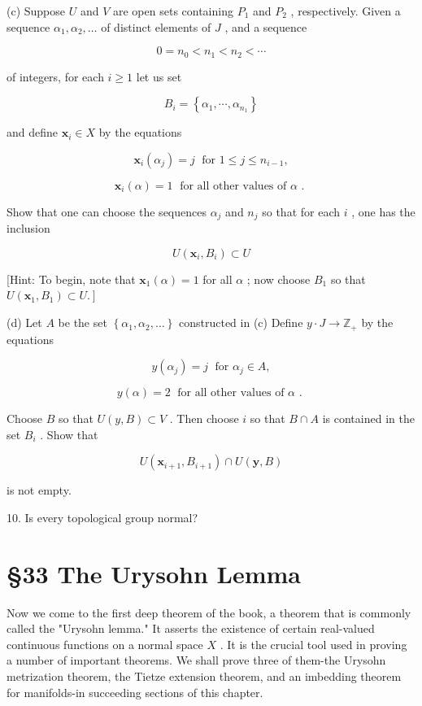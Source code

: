 (c) Suppose \(U\) and \(V\) are open sets containing \({P}_{1}\) and \({P}_{2}\) , respectively. Given a sequence \({\alpha }_{1},{\alpha }_{2},\ldots\) of distinct elements of \(J\) , and a sequence

\[
0 = {n}_{0} < {n}_{1} < {n}_{2} < \cdots
\]

of integers, for each \(i \geq  1\) let us set

\[
{B}_{i} = \left\{  {{\alpha }_{1},\cdots ,{\alpha }_{{n}_{1}}}\right\}
\]

and define \({\mathbf{x}}_{i} \in  X\) by the equations

\[
{\mathbf{x}}_{i}\left( {\alpha }_{j}\right)  = j\;\text{ for }1 \leq  j \leq  {n}_{i - 1},
\]

\[
{\mathbf{x}}_{i}\left( \alpha \right)  = 1\;\text{ for all other values of }\alpha \text{ . }
\]

Show that one can choose the sequences \({\alpha }_{j}\) and \({n}_{j}\) so that for each \(i\) , one has the inclusion

\[
U\left( {{\mathbf{x}}_{i},{B}_{i}}\right)  \subset  U
\]

[Hint: To begin, note that \({\mathbf{x}}_{1}\left( \alpha \right)  = 1\) for all \(\alpha\) ; now choose \({B}_{1}\) so that \(\left. {U\left( {{\mathbf{x}}_{1},{B}_{1}}\right)  \subset  U.}\right\rbrack\)

(d) Let \(A\) be the set \(\left\{  {{\alpha }_{1},{\alpha }_{2},\ldots }\right\}\) constructed in (c) Define \(y \cdot  J \rightarrow  {\mathbb{Z}}_{ + }\) by the equations

\[
y\left( {\alpha }_{j}\right)  = j\;\text{ for }{\alpha }_{j} \in  A,
\]

\[
y\left( \alpha \right)  = 2\;\text{ for all other values of }\alpha \text{ . }
\]

Choose \(B\) so that \(U\left( {y,B}\right)  \subset  V\) . Then choose \(i\) so that \(B \cap  A\) is contained in the set \({B}_{i}\) . Show that

\[
U\left( {{\mathbf{x}}_{i + 1},{B}_{i + 1}}\right)  \cap  U\left( {\mathbf{y},B}\right)
\]

is not empty.

10. Is every topological group normal?

\section*{§33 The Urysohn Lemma}

Now we come to the first deep theorem of the book, a theorem that is commonly called the "Urysohn lemma." It asserts the existence of certain real-valued continuous functions on a normal space \(X\) . It is the crucial tool used in proving a number of important theorems. We shall prove three of them-the Urysohn metrization theorem, the Tietze extension theorem, and an imbedding theorem for manifolds-in succeeding sections of this chapter.


